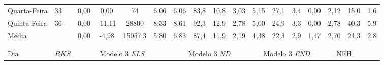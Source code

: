 \begin{landscape}
\begin{table}[H]
\begin{tabular}{llccccccccccccccc}
Quarta-Feira         & \multicolumn{1}{l|}{33}                     & 0,00                 & 0,00                 & \multicolumn{1}{c|}{74}      & 6,06                       & 6,06                 & 83,8                 & \multicolumn{1}{c|}{10,8}  & 3,03                       & 5,15                 & 27,1                 & \multicolumn{1}{c|}{3,4}   & 0,00                       & 2,12                 & 15,0                 & 1,6                  \\
Quinta-Feira         & \multicolumn{1}{l|}{36}                     & 0,00                 & -11,11               & \multicolumn{1}{c|}{28800}   & 8,33                       & 8,61                 & 92,3                 & \multicolumn{1}{c|}{12,9}  & 2,78                       & 5,00                 & 24,9                 & \multicolumn{1}{c|}{3,3}   & 0,00                       & 2,78                 & 40,3                 & 5,9                  \\ \hline
Média                & \multicolumn{1}{l|}{}                       & 0,00                 & -4,98                & \multicolumn{1}{c|}{15057,3} & 5,80                       & 6,83                 & 87,4                 & \multicolumn{1}{c|}{11,9}  & 2,19                       & 4,38                 & 22,3                 & \multicolumn{1}{c|}{2,9}   & 1,47                       & 2,70                 & 21,3                 & 2,8                  \\
                     &                                             & \multicolumn{1}{l}{} & \multicolumn{1}{l}{} & \multicolumn{1}{l}{}         & \multicolumn{1}{l}{}       & \multicolumn{1}{l}{} & \multicolumn{1}{l}{} & \multicolumn{1}{l}{}       & \multicolumn{1}{l}{}       & \multicolumn{1}{l}{} & \multicolumn{1}{l}{} & \multicolumn{1}{l}{}       & \multicolumn{1}{l}{}       & \multicolumn{1}{l}{} & \multicolumn{1}{l}{} & \multicolumn{1}{l}{} \\
                     &                                             & \multicolumn{1}{l}{} & \multicolumn{1}{l}{} & \multicolumn{1}{l}{}         & \multicolumn{1}{l}{}       & \multicolumn{1}{l}{} & \multicolumn{1}{l}{} & \multicolumn{1}{l}{}       & \multicolumn{1}{l}{}       & \multicolumn{1}{l}{} & \multicolumn{1}{l}{} & \multicolumn{1}{l}{}       & \multicolumn{1}{l}{}       & \multicolumn{1}{l}{} & \multicolumn{1}{l}{} & \multicolumn{1}{l}{} \\
\multirow{2}{*}{Dia} & \multicolumn{1}{l|}{\multirow{2}{*}{$BKS$}} & \multicolumn{4}{c|}{Modelo 3 \textit{ELS}}                                             & \multicolumn{4}{c|}{Modelo 3 \textit{ND}}                                            & \multicolumn{4}{c|}{Modelo 3 \textit{END}}                                           & \multicolumn{2}{c}{NEH}                     &                      \\

\end{tabular}
\end{table}
\end{landscape}

